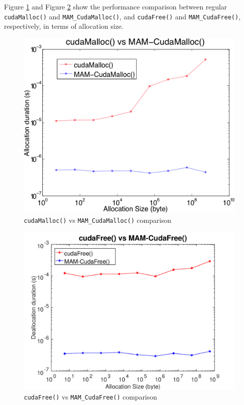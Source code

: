 \documentclass[conference]{IEEEtran}
\def\code#1{\texttt{#1}}
\begin{document}
Figure \ref{fig:cm-mcm} and Figure \ref{fig:cf-mcf} show the performance comparison between regular \code{cudaMalloc()} and \code{MAM\_CudaMalloc()}, and \code{cudaFree()} and \code{MAM\_CudaFree()}, respectively, in terms of allocation size.

\begin{figure}[h!]
\centering
  \includegraphics[width=0.85\linewidth]{cudamalloc-vs-mamcudamalloc.png}
  \caption{\code{cudaMalloc()} vs \code{MAM\_CudaMalloc()} comparison}
  \label{fig:cm-mcm}
\end{figure}

\begin{figure}[h!]
\centering
  \includegraphics[width=\linewidth]{cudafree-vs-mamcudafree.png}
  \caption{\code{cudaFree()} vs \code{MAM\_CudaFree()} comparison}
  \label{fig:cf-mcf}
\end{figure}
\end{document}
